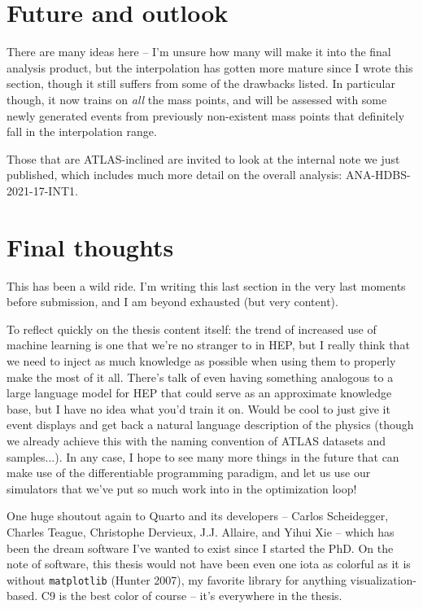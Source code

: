 \documentclass[
  11pt,
  numbers=noendperiod]{book}
\begin{document}
\hypertarget{future-and-outlook}{%
\section{Future and outlook}\label{future-and-outlook}}

There are many ideas here -- I'm unsure how many will make it into the
final analysis product, but the interpolation has gotten more mature
since I wrote this section, though it still suffers from some of the
drawbacks listed. In particular though, it now trains on \emph{all} the
mass points, and will be assessed with some newly generated events from
previously non-existent mass points that definitely fall in the
interpolation range.

Those that are ATLAS-inclined are invited to look at the internal note
we just published, which includes much more detail on the overall
analysis: ANA-HDBS-2021-17-INT1.

\newpage
\section*{Final thoughts}

This has been a wild ride. I'm writing this last section in the very last moments before submission, and I am beyond exhausted (but very content).

To reflect quickly on the thesis content itself: the trend of increased use of machine learning is one that we're no stranger to in HEP, but I really think that we need to inject as much knowledge as possible when using them to properly make the most of it all. There's talk of even having something analogous to a large language model for HEP that could serve as an approximate knowledge base, but I have no idea what you'd train it on. Would be cool to just give it event displays and get back a natural language description of the physics (though we already achieve this with the naming convention of ATLAS datasets and samples...). In any case, I hope to see many more things in the future that can make use of the differentiable programming paradigm, and let us use our simulators that we've put so much work into in the optimization loop!

One huge shoutout again to Quarto and its developers -- Carlos Scheidegger, Charles Teague, Christophe Dervieux, J.J. Allaire, and Yihui Xie -- which has been the dream software I've wanted to exist since I started the PhD.  On the note of software, this thesis would not have been even one iota as colorful as it is without \texttt{matplotlib} (Hunter 2007), my favorite library for anything visualization-based. C9 is the best color of course -- it's everywhere in the thesis.
\end{document}
